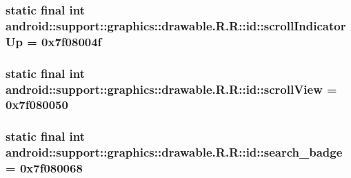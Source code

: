 \hypertarget{classandroid_1_1support_1_1graphics_1_1drawable_1_1_r_1_1id_3138882dd3dc53bf8796c8a878d93dcf}{
\subsubsection[{scrollIndicatorUp}]{\setlength{\rightskip}{0pt plus 5cm}static final int android::support::graphics::drawable.R.R::id::scrollIndicatorUp = 0x7f08004f}}
\label{classandroid_1_1support_1_1graphics_1_1drawable_1_1_r_1_1id_3138882dd3dc53bf8796c8a878d93dcf}


\hypertarget{classandroid_1_1support_1_1graphics_1_1drawable_1_1_r_1_1id_061e9e47c275b932626156688684f74a}{
\subsubsection[{scrollView}]{\setlength{\rightskip}{0pt plus 5cm}static final int android::support::graphics::drawable.R.R::id::scrollView = 0x7f080050}}
\label{classandroid_1_1support_1_1graphics_1_1drawable_1_1_r_1_1id_061e9e47c275b932626156688684f74a}


\hypertarget{classandroid_1_1support_1_1graphics_1_1drawable_1_1_r_1_1id_8db249d4d73492bf3cea9284084b9b7c}{
\subsubsection[{search\_\-badge}]{\setlength{\rightskip}{0pt plus 5cm}static final int android::support::graphics::drawable.R.R::id::search\_\-badge = 0x7f080068}}
\label{classandroid_1_1support_1_1graphics_1_1drawable_1_1_r_1_1id_8db249d4d73492bf3cea9284084b9b7c}


